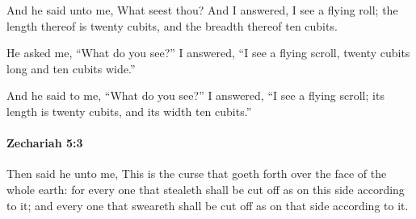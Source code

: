 			\begin{versebox}
					\item[BHS] 
					\item[LXX] 
					\item[ASV] And he said unto me, What seest thou? And I answered, I see a flying roll; the length thereof is twenty cubits, and the breadth thereof ten cubits.
					\item[NIV] He asked me, “What do you see?” I answered, “I see a flying scroll, twenty cubits long and ten cubits wide.”
					\item[NRSV] And he said to me, “What do you see?” I answered, “I see a flying scroll; its length is twenty cubits, and its width ten cubits.”
			\end{versebox}

		\paragraph{Zechariah 5:3} %
			\label{ZECHARIAH-5-3}

			Then said he unto me, This is the curse that goeth forth over the face of the whole earth: for every one that stealeth shall be cut off as on this side according to it; and every one that sweareth shall be cut off as on that side according to it.


